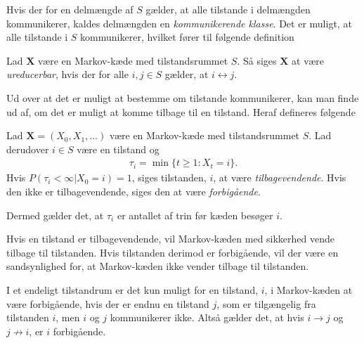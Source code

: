 Hvis der for en delmængde af $S$ gælder, at alle tilstande i delmængden kommunikerer, kaldes delmængden en \textit{kommunikerende klasse}. Det er muligt, at alle tilstande i $S$ kommunikerer, hvilket fører til følgende definition 

\begin{minipage}\textwidth
\begin{defn}\textbf{} %
\newline
Lad $\bm X$ være en Markov-kæde med tilstandsrummet $S$. Så siges $\bm X$ at være \textit{ureducerbar}, hvis der for alle $i,j \in S$ gælder, at $i \leftrightarrow j$.
\end{defn}
\end{minipage}

Ud over at det er muligt at bestemme om tilstande kommunikerer, kan man finde ud af, om det er muligt at komme tilbage til en tilstand. Heraf defineres følgende

\begin{minipage}\textwidth
\begin{defn}\textbf{} %
\newline
Lad $\bm X = (X_0, X_1, \dots)$ være en Markov-kæde med tilstandsrummet $S$. Lad derudover $i\in S$ være en tilstand og
\begin{align*}
    \tau_i=\min\{t\geq1:X_t=i\}.
\end{align*}
Hvis $P(\tau_i<\infty|X_0=i)=1$, siges tilstanden, $i$, at være \textit{tilbagevendende}. Hvis den ikke er tilbagevendende, siges den at være \textit{forbigående}.
\end{defn}
\end{minipage}

Dermed gælder det, at $\tau_i$ er antallet af trin før kæden besøger $i$.

Hvis en tilstand er tilbagevendende, vil Markov-kæden med sikkerhed vende tilbage til tilstanden. Hvis tilstanden derimod er forbigående, vil der være en sandsynlighed for, at Markov-kæden ikke vender tilbage til tilstanden. 



I et endeligt tilstandrum er det kun muligt for en tilstand, $i$, i Markov-kæden at være forbigående, hvis der er endnu en tilstand $j$, som er tilgængelig fra tilstanden $i$, men $i$ og $j$ kommunikerer ikke. Altså gælder det, at hvis $i \to j$ og $j \not\to i$, er $i$ forbigående.


